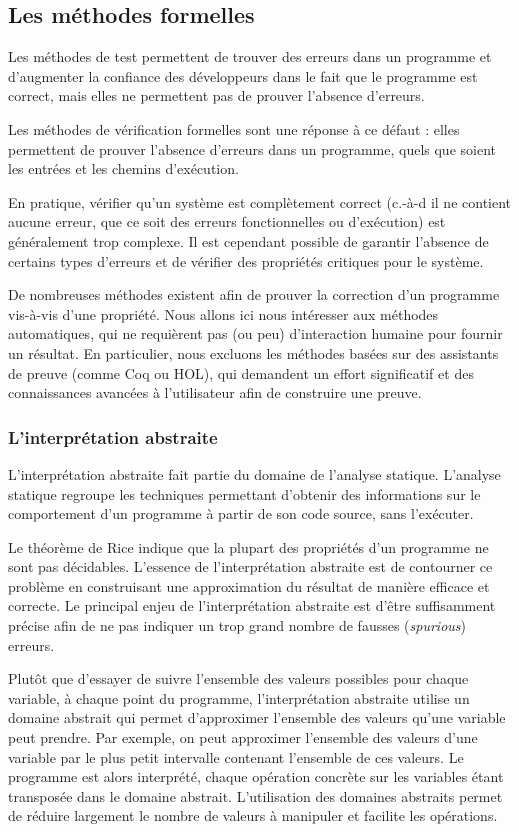 \subsection{Les méthodes formelles}

Les méthodes de test permettent de trouver des erreurs dans un programme
et d'augmenter la confiance des développeurs dans le fait que le
programme est correct, mais elles ne permettent pas de prouver l'absence
d'erreurs.

Les méthodes de vérification formelles sont une réponse à ce défaut :
elles permettent de prouver l'absence d'erreurs dans un programme,
quels que soient les entrées et les chemins d'exécution.

En pratique, vérifier qu'un système est complètement correct (c.-à-d il ne contient aucune erreur, que ce soit des erreurs
fonctionnelles ou d'exécution) est généralement trop complexe. Il est
cependant possible de garantir l'absence de certains types d'erreurs et de
vérifier des propriétés critiques pour le système.

De nombreuses méthodes existent afin de prouver la correction d'un
programme vis-à-vis d'une propriété. Nous allons ici nous intéresser aux
méthodes automatiques, qui ne requièrent pas (ou peu) d'interaction
humaine pour fournir un résultat. En particulier, nous excluons les
méthodes basées sur des assistants de preuve (comme Coq ou HOL), qui
demandent un effort significatif et des connaissances avancées à
l'utilisateur afin de construire une preuve.

\subsubsection{L'interprétation abstraite}

L'interprétation abstraite fait partie du domaine de l'analyse statique.
L'analyse statique regroupe les techniques permettant d'obtenir des
informations sur le comportement d'un programme à partir de son code
source, sans l'exécuter.

Le théorème de Rice indique que la plupart des propriétés d'un programme
ne sont pas décidables. L'essence de l'interprétation abstraite est de
contourner ce problème en construisant une approximation du résultat de
manière efficace et correcte. Le principal enjeu de
l'interprétation abstraite est d'être suffisamment précise afin de ne
pas indiquer un trop grand nombre de fausses (\emph{spurious}) erreurs.

Plutôt que d'essayer de suivre l'ensemble des valeurs possibles pour
chaque variable, à chaque point du programme, l'interprétation abstraite
utilise un domaine abstrait qui permet d'approximer l'ensemble des
valeurs qu'une variable peut prendre. Par exemple, on peut approximer
l'ensemble des valeurs d'une variable par le plus petit intervalle
contenant l'ensemble de ces valeurs. Le programme est alors interprété,
chaque opération concrète sur les variables étant transposée dans le
domaine abstrait. L'utilisation des domaines abstraits permet de réduire
largement le nombre de valeurs à manipuler et facilite les opérations.

